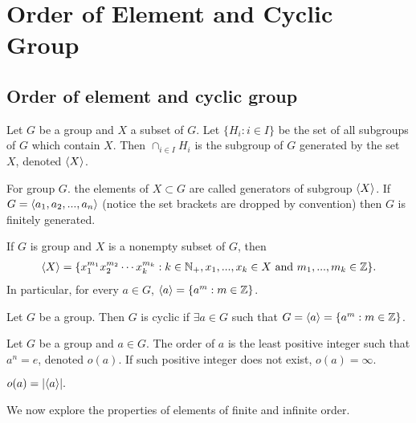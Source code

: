 \chapter{Order of Element and Cyclic Group}\label{chp:1_6}

\section{Order of element and cyclic group}

\begin{definition}{}{}
    Let $G$ be a group and $X$ a subset of $G$.
    Let $\{H_i:i\in I\}$ be the set of all subgroups of $G$
    which contain $X$. Then $\cap_{i\in I}H_i$ is the subgroup of $G$
    generated by the set $X$, denoted $\langle X\rangle$.
\end{definition}

\begin{definition}{}{}
    For group $G$. the elements of $X\subset G$
    are called generators of subgroup $\langle X\rangle$.
    If $G=\langle a_1,a_2,...,a_n\rangle$ (notice the set brackets are dropped by convention)
    then $G$ is finitely generated.
\end{definition}

\begin{theorem}{}{}
    If $G$ is group and $X$ is a nonempty subset of $G$,
    then
    \begin{align*}
        \langle X\rangle=\{x_1^{m_1}x_2^{m_2}\cdots x_k^{m_k}:k\in \mathbb{N}_+, x_1,...,x_k\in X \text{ and } m_1,...,m_k\in\mathbb{Z}\}.
    \end{align*}
    In particular, for every $a\in G$, $\langle a\rangle=\{a^m:m\in\mathbb{Z}\}$.
\end{theorem}

\begin{definition}{}{}
    Let $G$ be a group. Then 
    $G$ is cyclic if $\exists a\in G$
    such that $G=\langle a\rangle=\{a^m:m\in\mathbb{Z}\}$.
\end{definition}

\begin{definition}{}{}
    Let $G$ be a group and $a\in G$.
    The order of $a$ is the least positive integer such that $a^n=e$,
    denoted $o(a)$. If such positive integer does not exist, $o(a)=\infty$.
\end{definition}

\begin{proposition}{}{}
    $o(a)=|\langle a\rangle|.$
\end{proposition}


We now explore the properties of elements of finite and infinite order.

